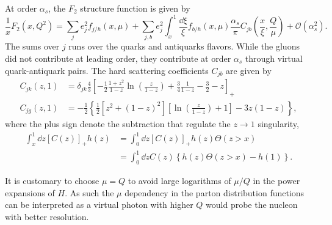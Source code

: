 \documentclass[../main.tex]{subfiles}
\begin{document}
At order $\alpha_s$, the $F_2$ structure function is given by \cite{collins1989}
\begin{equation}
	\frac{1}{x} F_2\left(x,Q^2\right) = \sum_j e^2_j f_{j/h}\left(x,\mu\right) + \sum_{j,b} e^2_j \int^1_x \frac{\dd{\xi}}{\xi} f_{b/h}\left(x,\mu\right) \frac{\alpha_s}{\pi} C_{jb}\left(\frac{x}{\xi}, \frac{Q}{\mu}\right) + \mathcal{O}(\alpha_s^2).
\end{equation}
The sums over $j$ runs over the quarks and antiquarks flavors. While the gluons
did not contribute at leading order, they contribute at order $\alpha_s$ through
virtual quark-antiquark pairs. The hard scattering coefficients $C_{jb}$ are
given by
\begin{align}
	C_{jk}(z,1) & = \delta_{jk} \frac{4}{3} \left[ -\frac{1}{2}\frac{1+z^2}{1-z} \ln\left(\frac{z}{1-z}\right) + \frac{3}{4} \frac{1}{1-z} -\frac{3}{2} -z\right]_+ \\
	C_{jg}(z,1) & = -\frac{1}{2} \left\{ \frac{1}{2}\left[z^2+(1-z)^2\right] \left[\ln\left(\frac{z}{1-z}\right)+1\right] -3z(1-z)\right\},
\end{align}
where the plus sign denote the subtraction that regulate the $z\rightarrow1$
singularity,
\begin{equation}
	\begin{split}
		\int^1_x \dd{z} \left[C(z)\right]_+ h(z) &= \int_0^1 \dd{z} \left[C(z)\right]_+ h(z)\Theta(z>x)\\
		& = \int_0^1 \dd{z} C(z) \left\{h(z)\Theta(z>x) -h(1)\right\}.
	\end{split}
\end{equation}

It is customary to choose $\mu =Q$ to avoid large logarithms of $\mu /Q$ in the
power expansions of $H$. As such the $\mu$ dependency in the parton distribution
functions can be interpreted as a virtual photon with higher $Q$ would probe the
nucleon with better resolution.
\end{document}
